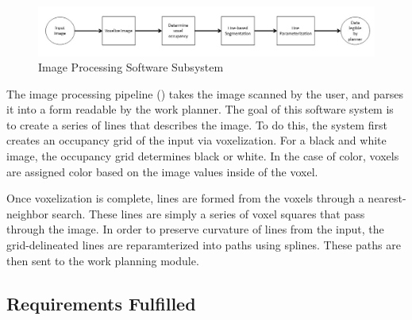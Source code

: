 \begin{figure}[!ht]
 \centering
  \includegraphics[width=0.99\columnwidth]{diagrams/sw_arch_image_processing.jpg}
	\caption{Image Processing Software Subsystem}
 \label{fig:image_processing}
\end{figure}

The image processing pipeline () takes the image scanned by the user, and parses it into a form readable by the work planner. The goal of this software system is to create a series of lines that describes the image. To do this, the system first creates an occupancy grid of the input via voxelization. For a black and white image, the occupancy grid determines black or white. In the case of color, voxels are assigned color based on the image values inside of the voxel.

Once voxelization is complete, lines are formed from the voxels through a nearest-neighbor search. These lines are simply a series of voxel squares that pass through the image. In order to preserve curvature of lines from the input, the grid-delineated lines are reparamterized into paths using splines. These paths are then sent to the work planning module.

\subsection{Requirements Fulfilled}
\label{subsec:image_processing_req_fulfilled}
